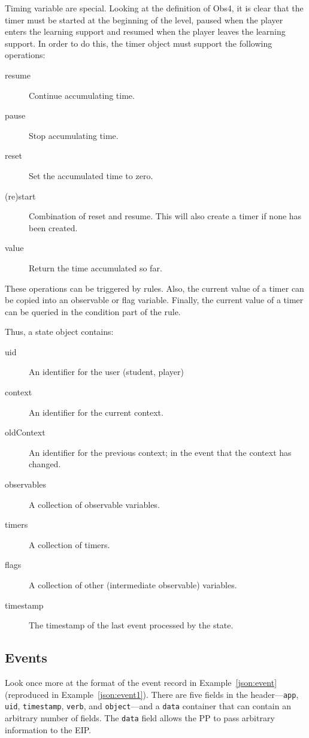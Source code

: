 \documentclass{article}
\begin{document}
  Timing variable are special.  Looking at the definition of Obs4, it
  is clear that the timer must be started at the beginning of the
  level, paused when the player enters the learning support and resumed
  when the player leaves the learning support.  In order to do this,
  the timer object must support the following operations:
  \begin{description}
  \item[resume]{Continue accumulating time.}
  \item[pause]{Stop accumulating time.}
  \item[reset]{Set the accumulated time to zero.}
  \item[(re)start]{Combination of reset and resume.  This will also
    create a timer if none has been created.}
  \item[value]{Return the time accumulated so far.}
  \end{description}

  These operations can be triggered by rules.  Also, the current value
  of a timer can be copied into an observable or flag variable.
  Finally, the current value of a timer can be queried in the
  condition part of the rule.

  Thus, a state object contains:
  \begin{description}
  \item[uid]{An identifier for the user (student, player)}
  \item[context]{An identifier for the current context.}
  \item[oldContext]{An identifier for the previous context; in the
    event that the context has changed.}
  \item[observables]{A collection of observable variables.}
  \item[timers]{A collection of timers.}
  \item[flags]{A collection of other (intermediate observable)
    variables.}
  \item[timestamp]{The timestamp of the last event processed by the state.}
  \end{description}
  

  \subsection{Events}
  \label{sub:events}

  Look once more at the format of the event record in
  Example~\ref{json:event} (reproduced in Example~\ref{json:event1}).
  There are five fields in the header---\texttt{app}, \texttt{uid},
  \texttt{timestamp}, \texttt{verb}, and \texttt{object}---and a
  \texttt{data} container that can contain an arbitrary number of
  fields.  The \texttt{data} field allows the PP to pass arbitrary
  information to the EIP.
\end{document}
